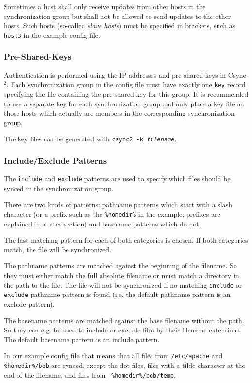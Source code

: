 \documentclass[a4paper,twocolumn]{article}
\def\csync2{{\sc Csync$^{2}$}}
\begin{document}
Sometimes a host shall only receive updates from other hosts in the
synchronization group but shall not be allowed to send updates to the other
hosts. Such hosts (so-called {\it slave hosts}) must be specified in
brackets, such as {\tt host3} in the example config file.

\subsubsection{Pre-Shared-Keys}

Authentication is performed using the IP addresses and pre-shared-keys in
\csync2. Each synchronization group in the config file must have exactly one
{\tt key} record specifying the file containing the pre-shared-key for this
group. It is recommended to use a separate key for each synchronization group
and only place a key file on those hosts which actually are members in the
corresponding synchronization group.

The key files can be generated with {\tt csync2 -k {\it filename}}.

\subsubsection{Include/Exclude Patterns}

The {\tt include} and {\tt exclude} patterns are used to specify which files
should be synced in the synchronization group.

There are two kinds of patterns: pathname patterns which start with a slash
character (or a prefix such as the {\tt \%homedir\%} in the example; prefixes
are explained in a later section) and basename patterns which do not.

The last matching pattern for each of both categories is chosen. If
both categories match, the file will be synchronized.

The pathname patterns are matched against the beginning of the filename. So they
must either match the full absolute filename or must match a directory in the
path to the file. The file will not be synchronized if no matching {\tt include} or
{\tt exclude} pathname pattern is found (i.e. the default pathname pattern is
an exclude pattern).

The basename patterns are matched against the base filename without the path. So
they can e.g. be used to include or exclude files by their filename extensions.
The default basename pattern is an include pattern.

In our example config file that means that all files from {\tt /etc/apache} and
{\tt \%homedir\%/bob} are synced, except the dot files, files with a tilde
character at the end of the filename, and files from {\tt
\%homedir\%/bob/temp}.
\end{document}
